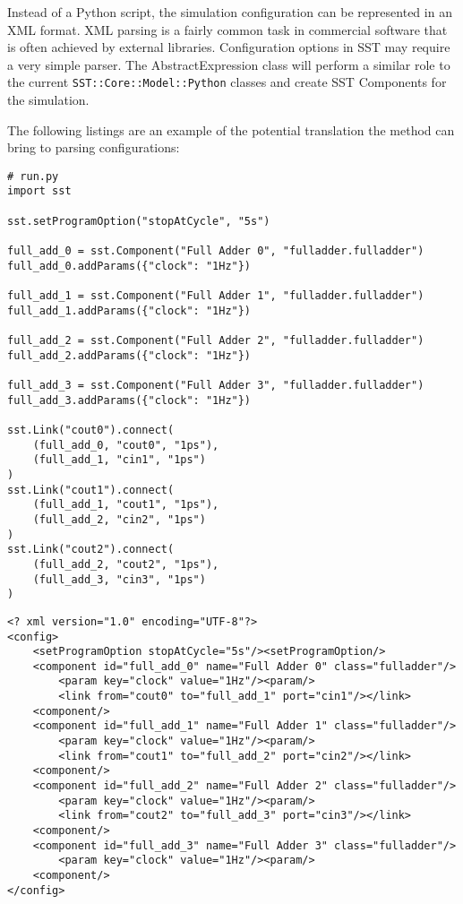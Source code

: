 Instead of a Python script, the simulation configuration can be represented in an XML format. XML parsing is a fairly common task in commercial software that is often achieved by external libraries. Configuration options in SST may require a very simple parser. The AbstractExpression class will perform a similar role to the current \texttt{SST::Core::Model::Python} classes and create SST Components for the simulation.

The following listings are an example of the potential translation the method can bring to parsing configurations:
\begin{lstlisting}[style=customPython,label=runPy,caption=Example SST Configuration File]
# run.py
import sst

sst.setProgramOption("stopAtCycle", "5s")

full_add_0 = sst.Component("Full Adder 0", "fulladder.fulladder")
full_add_0.addParams({"clock": "1Hz"})

full_add_1 = sst.Component("Full Adder 1", "fulladder.fulladder")
full_add_1.addParams({"clock": "1Hz"})

full_add_2 = sst.Component("Full Adder 2", "fulladder.fulladder")
full_add_2.addParams({"clock": "1Hz"})

full_add_3 = sst.Component("Full Adder 3", "fulladder.fulladder")
full_add_3.addParams({"clock": "1Hz"})

sst.Link("cout0").connect(
    (full_add_0, "cout0", "1ps"),
    (full_add_1, "cin1", "1ps")
)
sst.Link("cout1").connect(
    (full_add_1, "cout1", "1ps"),
    (full_add_2, "cin2", "1ps")
)
sst.Link("cout2").connect(
    (full_add_2, "cout2", "1ps"),
    (full_add_3, "cin3", "1ps")
)
\end{lstlisting}

\begin{lstlisting}[style=customXML,label=xml,caption=Potential Implementation of an SST Configuration File]
<? xml version="1.0" encoding="UTF-8"?>
<config>
    <setProgramOption stopAtCycle="5s"/><setProgramOption/>
    <component id="full_add_0" name="Full Adder 0" class="fulladder"/>
        <param key="clock" value="1Hz"/><param/>
        <link from="cout0" to="full_add_1" port="cin1"/></link>
    <component/>
    <component id="full_add_1" name="Full Adder 1" class="fulladder"/>
        <param key="clock" value="1Hz"/><param/>
        <link from="cout1" to="full_add_2" port="cin2"/></link>
    <component/>
    <component id="full_add_2" name="Full Adder 2" class="fulladder"/>
        <param key="clock" value="1Hz"/><param/>
        <link from="cout2" to="full_add_3" port="cin3"/></link>
    <component/>
    <component id="full_add_3" name="Full Adder 3" class="fulladder"/>
        <param key="clock" value="1Hz"/><param/>
    <component/>
</config>
\end{lstlisting}

